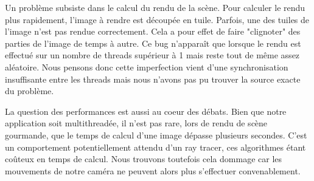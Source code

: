 \documentclass [11pt]{article}
\begin{document}
	Un problème subsiste dans le calcul du rendu de la scène. Pour calculer le rendu plus rapidement, l'image à rendre est découpée en tuile.
	Parfois, une des tuiles de l'image n'est pas rendue correctement. Cela a pour effet de faire "clignoter" des parties de l'image de temps à autre.
	Ce bug n'apparaît que lorsque le rendu est effectué sur un nombre de threads supérieur à 1 mais reste tout de même assez aléatoire.
	Nous pensons donc cette imperfection vient d'une synchronisation insuffisante entre les threads mais nous n'avons pas pu trouver la source exacte du problème.
	
	La question des performances est aussi au coeur des débats. Bien que notre application soit multithreadée, il n'est pas rare, lors de rendu de scène gourmande, que le
	temps de calcul d'une image dépasse plusieurs secondes. C'est un comportement potentiellement attendu d'un ray tracer, ces algorithmes étant coûteux en temps de calcul.
	Nous trouvons toutefois cela dommage car les mouvements de notre caméra ne peuvent alors plus s'effectuer convenablement.
\end{document}
